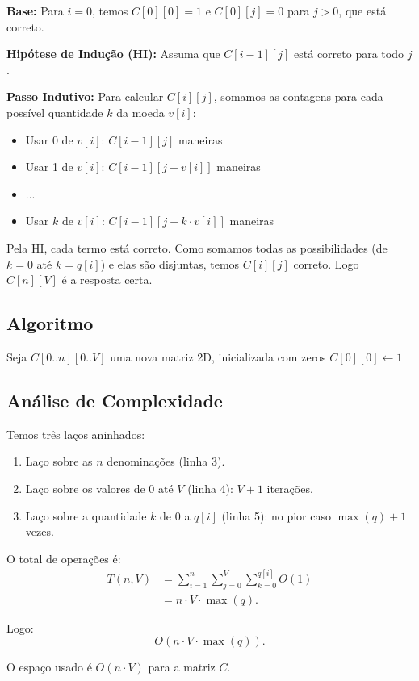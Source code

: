 \documentclass[a4paper,12pt]{article}
\begin{document}
\textbf{Base:} Para $i=0$, temos $C[0][0]=1$ e $C[0][j]=0$ para $j>0$, que está correto.

\textbf{Hipótese de Indução (HI):} Assuma que $C[i-1][j]$ está correto para todo $j$.

\textbf{Passo Indutivo:} Para calcular $C[i][j]$, somamos as contagens para cada possível quantidade $k$ da moeda $v[i]$:
\begin{itemize}
    \item Usar 0 de $v[i]$: $C[i-1][j]$ maneiras
    \item Usar 1 de $v[i]$: $C[i-1][j-v[i]]$ maneiras
    \item ...
    \item Usar $k$ de $v[i]$: $C[i-1][j-k \cdot v[i]]$ maneiras
\end{itemize}

Pela HI, cada termo está correto. Como somamos todas as possibilidades (de $k=0$ até $k=q[i]$) e elas são disjuntas, temos $C[i][j]$ correto. Logo $C[n][V]$ é a resposta certa.

\subsection*{Algoritmo}
\begin{algorithm}[H]
\SetAlgoLined
\caption{\texttt{NumeroComposicoes}$(v, q, n, V)$}
\BlankLine
Seja $C[0..n][0..V]$ uma nova matriz 2D, inicializada com zeros\;
$C[0][0] \leftarrow 1$\;
\;
\end{algorithm}

\subsection*{Análise de Complexidade}
Temos três laços aninhados:
\begin{enumerate}
    \item Laço sobre as $n$ denominações (linha 3).
    \item Laço sobre os valores de $0$ até $V$ (linha 4): $V+1$ iterações.
    \item Laço sobre a quantidade $k$ de $0$ a $q[i]$ (linha 5): no pior caso $\max(q)+1$ vezes.
\end{enumerate}

O total de operações é:
\begin{align*}
T(n, V) &= \sum_{i=1}^{n} \sum_{j=0}^{V} \sum_{k=0}^{q[i]} O(1) \\
&= n \cdot V \cdot \max(q).
\end{align*}

Logo:
\begin{equation}
\boxed{O(n \cdot V \cdot \max(q))}.
\end{equation}

O espaço usado é $O(n \cdot V)$ para a matriz $C$.
\end{document}
